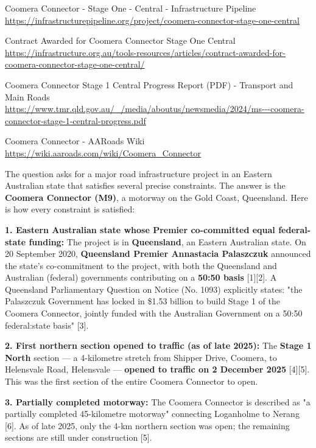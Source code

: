 \documentclass[table]{gtech}
\begin{document}
\begin{tcolorbox}
[11] Coomera Connector - Stage One - Central - Infrastructure Pipeline \url{https://infrastructurepipeline.org/project/coomera-connector-stage-one-central}\par
[12] Contract Awarded for Coomera Connector Stage One Central \url{https://infrastructure.org.au/tools-resources/articles/contract-awarded-for-coomera-connector-stage-one-central/}\par
[13] Coomera Connector Stage 1 Central Progress Report (PDF) - Transport and Main Roads \url{https://www.tmr.qld.gov.au/_/media/aboutus/newsmedia/2024/ms---coomera-connector-stage-1-central-progress.pdf}\par
[14] Coomera Connector - AARoads Wiki \url{https://wiki.aaroads.com/wiki/Coomera_Connector}
\end{tcolorbox}

\begin{tcolorbox}[breakable,enhanced jigsaw,colback=yellow!16,colframe=yellow!55,boxrule=0.4pt,left=5pt,right=5pt,top=3pt,bottom=3pt,fonttitle=\bfseries\sffamily\small,coltitle=black,fontupper=\small,title={Final explanation delivered to the user}]
The question asks for a major road infrastructure project in an Eastern Australian state that satisfies several precise constraints. The answer is the \textbf{Coomera Connector (M9)}, a motorway on the Gold Coast, Queensland. Here is how every constraint is satisfied:

\textbf{1. Eastern Australian state whose Premier co-committed equal federal-state funding:} The project is in \textbf{Queensland}, an Eastern Australian state. On 20 September 2020, \textbf{Queensland Premier Annastacia Palaszczuk} announced the state's co-commitment to the project, with both the Queensland and Australian (federal) governments contributing on a \textbf{50:50 basis} [1][2]. A Queensland Parliamentary Question on Notice (No. 1093) explicitly states: "the Palaszczuk Government has locked in \$1.53 billion to build Stage 1 of the Coomera Connector, jointly funded with the Australian Government on a 50:50 federal:state basis" [3].

\textbf{2. First northern section opened to traffic (as of late 2025):} The \textbf{Stage 1 North} section --- a 4-kilometre stretch from Shipper Drive, Coomera, to Helensvale Road, Helensvale --- \textbf{opened to traffic on 2 December 2025} [4][5]. This was the first section of the entire Coomera Connector to open.

\textbf{3. Partially completed motorway:} The Coomera Connector is described as "a partially completed 45-kilometre motorway" connecting Loganholme to Nerang [6]. As of late 2025, only the 4-km northern section was open; the remaining sections are still under construction [5].


\end{tcolorbox}
\end{document}
